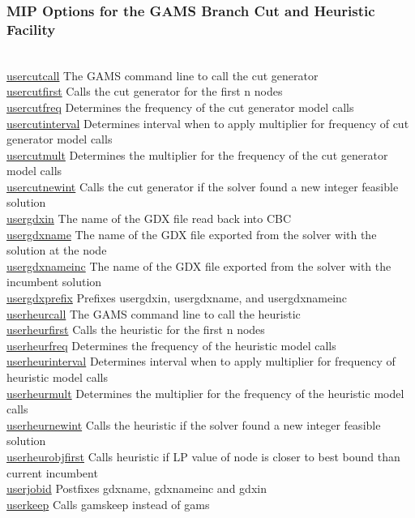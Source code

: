 \subsubsection{MIP Options for the GAMS Branch Cut and Heuristic Facility}

\begin{tabbing}
\hspace {1.3in} \= \\
\hyperlink{usercutcall}
{usercutcall} \> The GAMS command line to call the cut generator \\
\hyperlink{usercutfirst}
{usercutfirst} \> Calls the cut generator for the first n nodes \\
\hyperlink{usercutfreq}
{usercutfreq} \> Determines the frequency of the cut generator model calls \\
\hyperlink{usercutinterval}
{usercutinterval} \> Determines interval when to apply multiplier for frequency of cut generator model calls \\
\hyperlink{usercutmult}
{usercutmult} \> Determines the multiplier for the frequency of the cut generator model calls \\
\hyperlink{usercutnewint}
{usercutnewint} \> Calls the cut generator if the solver found a new integer feasible solution \\
\hyperlink{usergdxin}
{usergdxin} \> The name of the GDX file read back into CBC \\
\hyperlink{usergdxname}
{usergdxname} \> The name of the GDX file exported from the solver with the solution at the node \\
\hyperlink{usergdxnameinc}
{usergdxnameinc} \> The name of the GDX file exported from the solver with the incumbent solution \\
\hyperlink{usergdxprefix}
{usergdxprefix} \> Prefixes usergdxin, usergdxname, and usergdxnameinc \\
\hyperlink{userheurcall}
{userheurcall} \> The GAMS command line to call the heuristic \\
\hyperlink{userheurfirst}
{userheurfirst} \> Calls the heuristic for the first n nodes \\
\hyperlink{userheurfreq}
{userheurfreq} \> Determines the frequency of the heuristic model calls \\
\hyperlink{userheurinterval}
{userheurinterval} \> Determines interval when to apply multiplier for frequency of heuristic model calls \\
\hyperlink{userheurmult}
{userheurmult} \> Determines the multiplier for the frequency of the heuristic model calls \\
\hyperlink{userheurnewint}
{userheurnewint} \> Calls the heuristic if the solver found a new integer feasible solution \\
\hyperlink{userheurobjfirst}
{userheurobjfirst} \> Calls heuristic if LP value of node is closer to best bound than current incumbent \\
\hyperlink{userjobid}
{userjobid} \> Postfixes gdxname, gdxnameinc and gdxin \\
\hyperlink{userkeep}
{userkeep} \> Calls gamskeep instead of gams
\end{tabbing}
